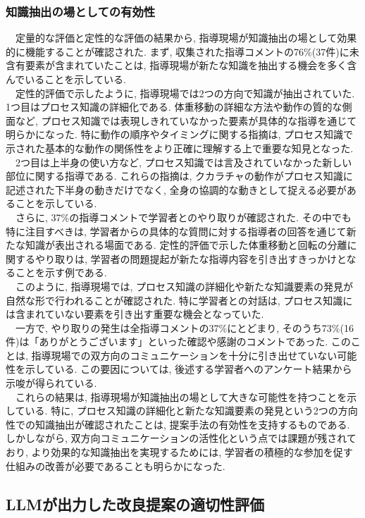 \subsubsection{知識抽出の場としての有効性}
　定量的な評価と定性的な評価の結果から, 指導現場が知識抽出の場として効果的に機能することが確認された. まず, 収集された指導コメントの76\%(37件)に未含有要素が含まれていたことは, 指導現場が新たな知識を抽出する機会を多く含んでいることを示している.\\
　定性的評価で示したように, 指導現場では2つの方向で知識が抽出されていた. 1つ目はプロセス知識の詳細化である. 体重移動の詳細な方法や動作の質的な側面など, プロセス知識では表現しきれていなかった要素が具体的な指導を通じて明らかになった. 特に動作の順序やタイミングに関する指摘は, プロセス知識で示された基本的な動作の関係性をより正確に理解する上で重要な知見となった.\\
　2つ目は上半身の使い方など, プロセス知識では言及されていなかった新しい部位に関する指導である. これらの指摘は, クカラチャの動作がプロセス知識に記述された下半身の動きだけでなく, 全身の協調的な動きとして捉える必要があることを示している.\\
　さらに, 37\%の指導コメントで学習者とのやり取りが確認された. その中でも特に注目すべきは, 学習者からの具体的な質問に対する指導者の回答を通じて新たな知識が表出される場面である. 定性的評価で示した体重移動と回転の分離に関するやり取りは, 学習者の問題提起が新たな指導内容を引き出すきっかけとなることを示す例である.\\
　このように, 指導現場では, プロセス知識の詳細化や新たな知識要素の発見が自然な形で行われることが確認された. 特に学習者との対話は, プロセス知識には含まれていない要素を引き出す重要な機会となっていた.\\
　一方で, やり取りの発生は全指導コメントの37\%にとどまり, そのうち73\%(16件)は「ありがとうございます」といった確認や感謝のコメントであった. このことは, 指導現場での双方向のコミュニケーションを十分に引き出せていない可能性を示している. この要因については, 後述する学習者へのアンケート結果から示唆が得られている.\\
　これらの結果は, 指導現場が知識抽出の場として大きな可能性を持つことを示している. 特に, プロセス知識の詳細化と新たな知識要素の発見という2つの方向性での知識抽出が確認されたことは, 提案手法の有効性を支持するものである. しかしながら, 双方向コミュニケーションの活性化という点では課題が残されており, より効果的な知識抽出を実現するためには, 学習者の積極的な参加を促す仕組みの改善が必要であることも明らかになった. 


\subsection{LLMが出力した改良提案の適切性評価}
